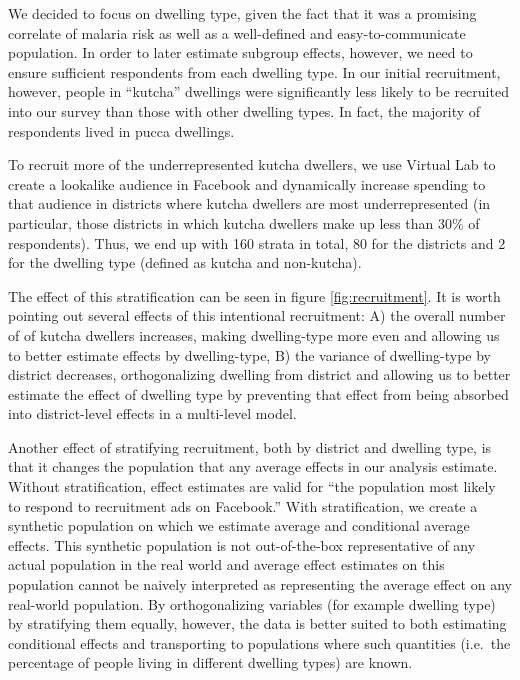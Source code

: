 \documentclass[a4paper,12pt]{article}
\begin{document}
We decided to focus on dwelling type, given the fact that it was a promising correlate of malaria risk as well as a well-defined and easy-to-communicate population. In order to later estimate subgroup effects, however, we need to ensure sufficient respondents from each dwelling type. In our initial recruitment, however, people in ``kutcha'' dwellings were significantly less likely to be recruited into our survey than those with other dwelling types. In fact, the majority of respondents lived in pucca dwellings.

To recruit more of the underrepresented kutcha dwellers, we use Virtual Lab to create a lookalike audience in Facebook and dynamically increase spending to that audience in districts where kutcha dwellers are most underrepresented (in particular, those districts in which kutcha dwellers make up less than 30\% of respondents). Thus, we end up with 160 strata in total, 80 for the districts and 2 for the dwelling type (defined as kutcha and non-kutcha).

The effect of this stratification can be seen in figure \ref{fig:recruitment}. It is worth pointing out several effects of this intentional recruitment: A) the overall number of of kutcha dwellers increases, making dwelling-type more even and allowing us to better estimate effects by dwelling-type, B) the variance of dwelling-type by district decreases, orthogonalizing dwelling from district and allowing us to better estimate the effect of dwelling type by preventing that effect from being absorbed into district-level effects in a multi-level model.

Another effect of stratifying recruitment, both by district and dwelling type, is that it changes the population that any average effects in our analysis estimate. Without stratification, effect estimates are valid for ``the population most likely to respond to recruitment ads on Facebook.'' With stratification, we create a synthetic population on which we estimate average and conditional average effects. This synthetic population is not out-of-the-box representative of any actual population in the real world and average effect estimates on this population cannot be naively interpreted as representing the average effect on any real-world population. By orthogonalizing variables (for example dwelling type) by stratifying them equally, however, the data is better suited to both estimating conditional effects and transporting to populations where such quantities (i.e.\ the percentage of people living in different dwelling types) are known.
\end{document}
